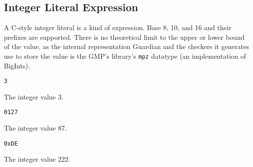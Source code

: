 
\subsection{Integer Literal Expression}
{
	A C-style integer literal is a kind of expression.
	Base 8, 10, and 16 and their prefixes are supported.
	There is no theoretical limit to the upper or lower bound of the value,
	as the internal representation Guardian and the checkers it generates
	use to store the value
	is the GMP's library's \texttt{mpz} datatype (an implementation of BigInts).
	
	\begin{itemize}
	{
		\item[] \texttt{3}
		
			The integer value 3.
		
		\item[] \texttt{0127}
		
			The integer value 87.
		
		\item[] \texttt{0xDE}
		
			The integer value 222.
	}
	\end{itemize}
}
